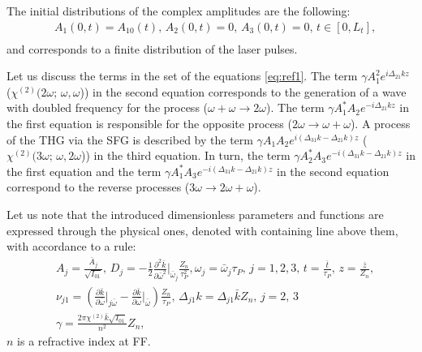 \documentclass[a4paper, 12pt, onecolumn]{extarticle}
\begin{document}
The initial distributions of the complex amplitudes are the following:
\begin{equation}\begin{aligned}
\label{eq:first}
&A_1(0,t)=A_{10}(t),\, A_2(0,t)=0,\,A_3(0,t)=0,\, t\in[0,L_t],\\
\end{aligned}\end{equation}
and corresponds to a finite distribution of the laser pulses.

Let us discuss the terms in the set of the equations \eqref{eq:ref1}. The term \(\gamma A_1^2e^{i\Delta_{21} kz}\) (\(\chi^{(2)}(2\omega;\,\omega,\omega\))) in the second equation corresponds to the generation of a wave with doubled frequency for the process (\(\omega+\omega\rightarrow2\omega\)). The term \(\gamma  A_1^* A_2e^{-i\Delta_{21} kz}\) in the first equation is responsible for the opposite process (\(2\omega \rightarrow \omega+\omega\)). A process of the THG via the SFG is described by the term \(\gamma A_1 A_2e^{i(\Delta_{31}k-\Delta_{21}k)z}\) (\(\chi^{(2)}(3\omega;\,\omega,2\omega\))) in the third equation. In turn, the term \(\gamma A_2^* A_3e^{-i(\Delta_{31}k-\Delta_{21}k)z}\) in the first equation and the term \(\gamma A_1^* A_3e^{-i(\Delta_{31}k-\Delta_{21}k)z}\) in the second equation correspond to the reverse processes (\(3\omega\rightarrow2\omega+\omega\)). 

Let us note that the introduced dimensionless parameters and functions are expressed through the physical ones, denoted with containing line above them, with accordance to a rule:
\begin{equation}
\label{eq:pars}
\begin{aligned}
&A_j=\frac{\bar{A}_j}{\sqrt{I_{01}}},\,D_j=-\frac{1}{2}\frac{\partial^2 \bar{k}}{\partial \bar{\omega}^2}\Big|_{\bar{\omega}_j}\frac{Z_n}{\tau_P^2},\omega_j=\bar{\omega}_j\tau_P,\,j=1,2,3,\,t=\frac{\bar{t}}{\tau_P},\,z=\frac{\bar{z}}{Z_n},\\
&\nu_{j1}=\left(\frac{\partial \bar{k}}{\partial \bar{\omega}}\Big|_{j\bar{\omega}}-\frac{\partial \bar{k}}{\partial \bar{\omega}}\Big|_{\bar{\omega}}\right)\frac{Z_n}{\tau_P},\,\Delta_{j1}k=\Delta_{j1}\bar{k}Z_n,\,j=2,\,3\\
&\gamma=\frac{2\pi\chi^{(2)}\bar{k}\sqrt{I_{01}}}{n^2}Z_n,
\end{aligned}
\end{equation}
$n$ is a refractive index at FF.
\end{document}
